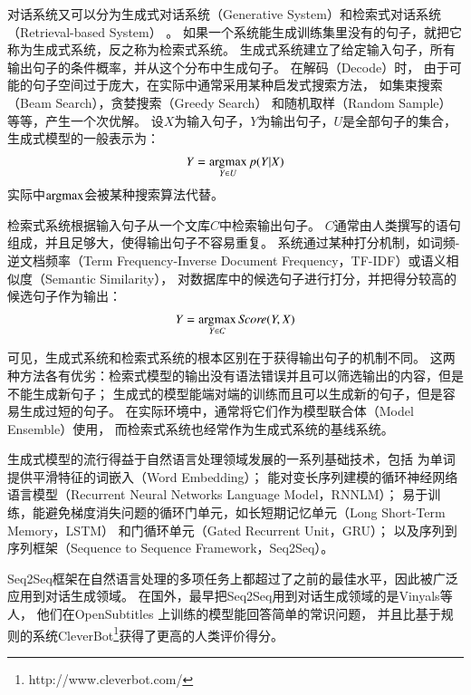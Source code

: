 对话系统又可以分为生成式对话系统（Generative System）和检索式对话系统（Retrieval-based System）
。
如果一个系统能生成训练集里没有的句子，就把它称为生成式系统，反之称为检索式系统。
生成式系统建立了给定输入句子，所有输出句子的条件概率，并从这个分布中生成句子。
在解码（Decode）时，
由于可能的句子空间过于庞大，在实际中通常采用某种启发式搜索方法，
如集束搜索（Beam Search），贪婪搜索（Greedy Search）
和随机取样（Random Sample）等等，产生一个次优解。
设$X$为输入句子，$Y$为输出句子，$U$是全部句子的集合，生成式模型的一般表示为：
\begin{align}
    Y = \operatorname*{argmax}_{Y\in U} p(Y|X)
\end{align}
实际中$\operatorname*{argmax}$会被某种搜索算法代替。

检索式系统根据输入句子从一个文库$C$中检索输出句子。
$C$通常由人类撰写的语句组成，并且足够大，使得输出句子不容易重复。
系统通过某种打分机制，如词频-逆文档频率（Term Frequency-Inverse Document Frequency，TF-IDF）或语义相似度（Semantic Similarity），
对数据库中的候选句子进行打分，并把得分较高的候选句子作为输出：
\begin{align}
    Y = \operatorname*{argmax}_{Y\in C} \textit{Score}(Y, X)
\end{align}

可见，生成式系统和检索式系统的根本区别在于获得输出句子的机制不同。
这两种方法各有优劣：检索式模型的输出没有语法错误并且可以筛选输出的内容，但是不能生成新句子；
生成式的模型能端对端的训练而且可以生成新的句子，但是容易生成过短的句子。
在实际环境中，通常将它们作为模型联合体（Model Ensemble）使用，
而检索式系统也经常作为生成式系统的基线系统。

生成式模型的流行得益于自然语言处理领域发展的一系列基础技术，包括
为单词提供平滑特征的词嵌入（Word Embedding）；
能对变长序列建模的循环神经网络语言模型（Recurrent Neural Networks Language Model，RNNLM）；
易于训练，能避免梯度消失问题的循环门单元，如长短期记忆单元（Long Short-Term Memory，LSTM）
和门循环单元（Gated Recurrent Unit，GRU）；
以及序列到序列框架（Sequence to Sequence Framework，Seq2Seq）。

Seq2Seq框架在自然语言处理的多项任务上都超过了之前的最佳水平，因此被广泛应用到对话生成领域。
在国外，最早把Seq2Seq用到对话生成领域的是Vinyals等人，
他们在OpenSubtitles
上训练的模型能回答简单的常识问题，
并且比基于规则的系统CleverBot\footnote{http://www.cleverbot.com/}获得了更高的人类评价得分。

